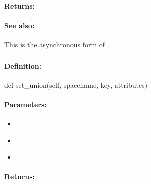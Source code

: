 \paragraph{Returns:}


\paragraph{See also:}  This is the asynchronous form of .

\pagebreak
\subsubsection{}
\label{api:python:set_union}


\paragraph{Definition:}
\begin{pythoncode}
def set_union(self, spacename, key, attributes)
\end{pythoncode}

\paragraph{Parameters:}
\begin{itemize}[noitemsep]
\item {}\\

\item {}\\

\item {}\\

\end{itemize}

\paragraph{Returns:}


\pagebreak
\subsubsection{}
\label{api:python:async_set_union}


